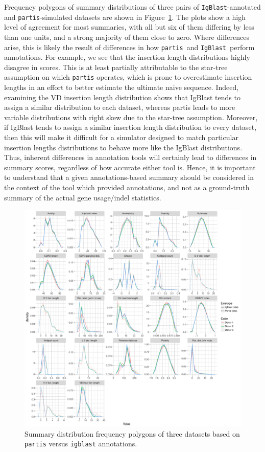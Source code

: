 \documentclass{article}
\newcommand{\partis}{\texttt{partis}}
\newcommand{\igblast}{\texttt{IgBlast}}
\begin{document}
Frequency polygons of summary distributions of three pairs of \igblast-annotated and \partis-simulated datasets are shown in Figure~\ref{fig:PartisIgBlastFreqpolys}.
The plots show a high level of agreement for most summaries, with all but six of them differing by less than one units, and a strong majority of them close to zero.
Where differences arise, this is likely the result of differences in how \partis\ and \igblast\ perform annotations.
For example, we see that the insertion length distributions highly disagree in scores.
This is at least partially attributable to the star-tree assumption on which \texttt{partis} operates, which is prone to overestimate insertion lengths in an effort to better estimate the ultimate naive sequence.
Indeed, examining the VD insertion length distribution shows that IgBlast tends to assign a similar distribution to each dataset, whereas partis leads to more variable distributions with right skew due to the star-tree assumption.
Moreover, if IgBlast tends to assign a similar insertion length distribution to every dataset, then this will make it difficult for a simulator designed to match particular insertion lengths distributions to behave more like the IgBlast distributions.
Thus, inherent differences in annotation tools will certainly lead to differences in summary scores, regardless of how accurate either tool is.
Hence, it is important to understand that a given annotations-based summary should be considered in the context of the tool which provided annotations, and not as a ground-truth summary of the actual gene usage/indel statistics.

\begin{figure}
    \includegraphics[width=\linewidth]{Figures/PartisScores/pi_freqpoly.pdf}
    \caption{Summary distribution frequency polygons of three datasets based on \texttt{partis} versus \texttt{igblast} annotations.}
    \label{fig:PartisIgBlastFreqpolys}
\end{figure}
\end{document}
